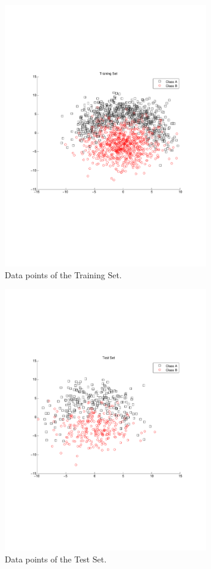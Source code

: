 \documentclass[letterpaper,11pt]{article}
\begin{document}
 \begin{figure}[h!]
\centering
  \includegraphics[trim = 0cm 7.5cm 0cm 7cm, clip, width=0.8\textwidth]{figures/TrainingSet.pdf}
  \caption{Data points of the Training Set.}
  \label{fig:1}
\end{figure}
 
  \begin{figure}[t!]
\centering
  \includegraphics[trim = 0cm 7.5cm 0cm 7cm, clip, width=0.8\textwidth]{figures/TestSet.pdf}
  \caption{Data points of the Test Set.}
  \label{fig:2}
\end{figure}
\end{document}
